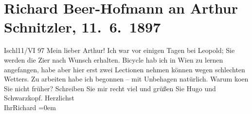 

         
         \renewcommand{\erwaehntePersonen}{Personen: Richard Beer-Hofmann, Hugo von Hofmannsthal, Leopold Petter, Gustav Schwarzkopf}
         \renewcommand{\erwaehnteOrte}{Orte: Bad Ischl, Wien}
         \renewcommand{\erwaehnteWerke}{}
               \section[Richard Beer-Hofmann an Arthur Schnitzler, 11. 6. 1897]{ Richard Beer-Hofmann an Arthur Schnitzler, 11. 6. 1897}\nopagebreak{}\rehead{ }\begin{ledgroupsized}[t]{13cm}\normalsize\beginnumbering \toendnotes[C]{\smallbreak\pagebreak[2]} 
\pstart
           \raggedleft{}{\pb}Ischl11/VI 97\pend
           \pstart
           Mein lieber Arthur!\pend
           \pstart
           Ich war vor einigen Tagen bei Leopold; Sie
               werden die Zi{\geminationm}er nach Wunsch erhalten. Bicycle hab ich
               in Wien zu lernen angefangen, habe aber hier erst
               zwei Lectionen nehmen können wegen schlechten Wetters.\pend
           \pstart
           {\pb}Zu arbeiten habe ich begonnen –
               mit Unbehagen natürlich.\pend
           \pstart
           Warum ko{\geminationm}en Sie nicht früher? Schreiben Sie mir recht
               viel und grüßen Sie Hugo und Schwarzkopf.\pend
           \pstart
           Herzlichst{\\[\baselineskip]}Ihr\spacefill\mbox{Richard}\pend
           \leftskip=0em{}
         
         \endnumbering{}\end{ledgroupsized}  \newcommand{\dateiname}{L00684}\newcommand{\titel}{Richard Beer-Hofmann an Arthur Schnitzler, 11. 6. 1897}\newcommand{\editorInnen}{Martin Anton Müller und Gerd-Hermann Susen}
      